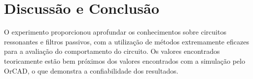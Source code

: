 \newpage
\section{Discussão e Conclusão}
O experimento proporcionou aprofundar os conhecimentos sobre circuitos ressonantes e filtros passivos, com a utilização de métodos extremamente eficazes para a avaliação do comportamento do circuito. Os valores encontrados teoricamente estão bem próximos dos valores encontrados com a simulação pelo OrCAD, o que demonstra a confiabilidade dos resultados.